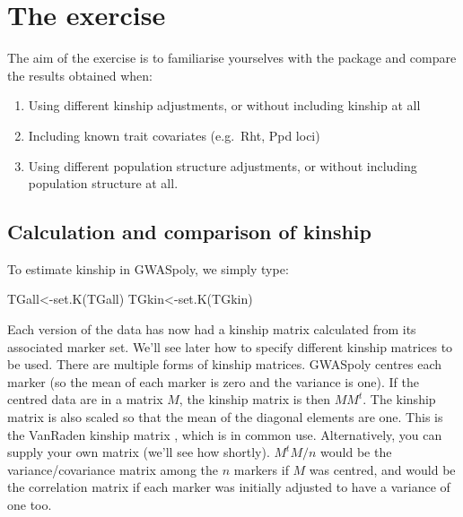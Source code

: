 \documentclass[
]{book}
\newenvironment{Shaded}{\begin{snugshade}}{\end{snugshade}}
\newcommand{\FunctionTok}[1]{\textcolor[rgb]{0.00,0.00,0.00}{#1}}
\newcommand{\NormalTok}[1]{#1}
\newcommand{\OtherTok}[1]{\textcolor[rgb]{0.56,0.35,0.01}{#1}}
\providecommand{\tightlist}{%
  \setlength{\itemsep}{0pt}\setlength{\parskip}{0pt}}
\begin{document}
\hypertarget{the-exercise-2}{%
\section{The exercise}\label{the-exercise-2}}

The aim of the exercise is to familiarise yourselves with the package and compare the results obtained when:

\begin{enumerate}
\def\labelenumi{\alph{enumi})}
\tightlist
\item
  Using different kinship adjustments, or without including kinship at all
\item
  Including known trait covariates (e.g.~Rht, Ppd loci)
\item
  Using different population structure adjustments, or without including population structure at all.
\end{enumerate}

\hypertarget{calculation-and-comparison-of-kinship}{%
\subsection{Calculation and comparison of kinship}\label{calculation-and-comparison-of-kinship}}

To estimate kinship in GWASpoly, we simply type:

\begin{Shaded}
\begin{Highlighting}[]
\NormalTok{TGall}\OtherTok{\textless{}{-}}\FunctionTok{set.K}\NormalTok{(TGall)  }
\NormalTok{TGkin}\OtherTok{\textless{}{-}}\FunctionTok{set.K}\NormalTok{(TGkin) }
\end{Highlighting}
\end{Shaded}

Each version of the data has now had a kinship matrix calculated from its associated marker set. We'll see later how to specify different kinship matrices to be used. There are multiple forms of kinship matrices. GWASpoly centres each marker (so the mean of each marker is zero and the variance is one). If the centred data are in a matrix \(M\), the kinship matrix is then \(MM^t\). The kinship matrix is also scaled so that the mean of the diagonal elements are one. This is the VanRaden kinship matrix \citep{vanraden_efficient_2008}, which is in common use. Alternatively, you can supply your own matrix (we'll see how shortly). \(M^tM/n\) would be the variance/covariance matrix among the \(n\) markers if \(M\) was centred, and would be the correlation matrix if each marker was initially adjusted to have a variance of one too.
\end{document}
